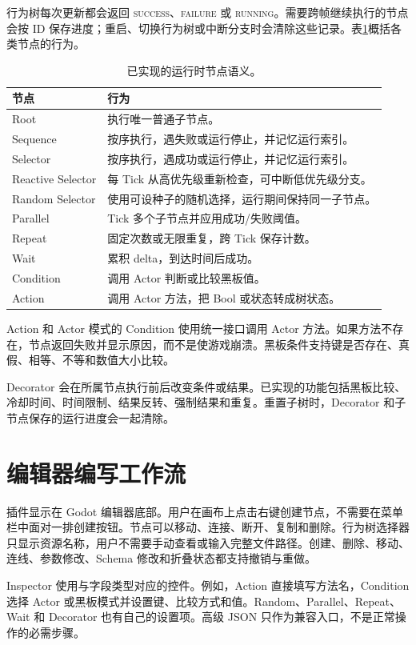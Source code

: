 行为树每次更新都会返回 \textsc{success}、\textsc{failure} 或 \textsc{running}。需要跨帧继续执行的节点会按 ID 保存进度；重启、切换行为树或中断分支时会清除这些记录。表\ref{tab:nodes}概括各类节点的行为。

\begin{table}[htbp]
\centering
\caption{已实现的运行时节点语义。}\label{tab:nodes}
\begin{tabular}{p{}p{}}
\toprule 节点 & 行为 \\
\midrule
Root & 执行唯一普通子节点。\\
Sequence & 按序执行，遇失败或运行停止，并记忆运行索引。\\
Selector & 按序执行，遇成功或运行停止，并记忆运行索引。\\
Reactive Selector & 每 Tick 从高优先级重新检查，可中断低优先级分支。\\
Random Selector & 使用可设种子的随机选择，运行期间保持同一子节点。\\
Parallel & Tick 多个子节点并应用成功/失败阈值。\\
Repeat & 固定次数或无限重复，跨 Tick 保存计数。\\
Wait & 累积 delta，到达时间后成功。\\
Condition & 调用 Actor 判断或比较黑板值。\\
Action & 调用 Actor 方法，把 Bool 或状态转成树状态。\\
\bottomrule
\end{tabular}
\end{table}

Action 和 Actor 模式的 Condition 使用统一接口调用 Actor 方法。如果方法不存在，节点返回失败并显示原因，而不是使游戏崩溃。黑板条件支持键是否存在、真假、相等、不等和数值大小比较。

Decorator 会在所属节点执行前后改变条件或结果。已实现的功能包括黑板比较、冷却时间、时间限制、结果反转、强制结果和重复。重置子树时，Decorator 和子节点保存的运行进度会一起清除。

\section{编辑器编写工作流}

插件显示在 Godot 编辑器底部。用户在画布上点击右键创建节点，不需要在菜单栏中面对一排创建按钮。节点可以移动、连接、断开、复制和删除。行为树选择器只显示资源名称，用户不需要手动查看或输入完整文件路径。创建、删除、移动、连线、参数修改、Schema 修改和折叠状态都支持撤销与重做。

Inspector 使用与字段类型对应的控件。例如，Action 直接填写方法名，Condition 选择 Actor 或黑板模式并设置键、比较方式和值。Random、Parallel、Repeat、Wait 和 Decorator 也有自己的设置项。高级 JSON 只作为兼容入口，不是正常操作的必需步骤。

